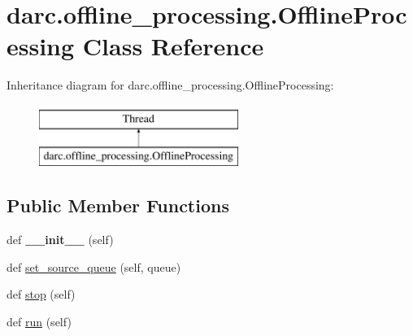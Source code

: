 \hypertarget{classdarc_1_1offline__processing_1_1_offline_processing}{}\section{darc.\+offline\+\_\+processing.\+Offline\+Processing Class Reference}
\label{classdarc_1_1offline__processing_1_1_offline_processing}
Inheritance diagram for darc.\+offline\+\_\+processing.\+Offline\+Processing\+:\begin{figure}[H]
\begin{center}
\leavevmode
\includegraphics[height=2.000000cm]{classdarc_1_1offline__processing_1_1_offline_processing}
\end{center}
\end{figure}
\subsection*{Public Member Functions}
\begin{DoxyCompactItemize}
\item 
\mbox{\label{classdarc_1_1offline__processing_1_1_offline_processing_a99afa1c4f6f91890f17c7c39bda54696}} 
def {\bfseries \+\_\+\+\_\+init\+\_\+\+\_\+} (self)
\item 
def \mbox{\hyperlink{classdarc_1_1offline__processing_1_1_offline_processing_abfffd0fa408fa946fdc8d60662e1dc41}{set\+\_\+source\+\_\+queue}} (self, queue)
\item 
def \mbox{\hyperlink{classdarc_1_1offline__processing_1_1_offline_processing_ab42c7966d7982b49acd82ad2a596b460}{stop}} (self)
\item 
def \mbox{\hyperlink{classdarc_1_1offline__processing_1_1_offline_processing_a54eaa9ed16ace461feaed56058f6372c}{run}} (self)
\end{DoxyCompactItemize}
